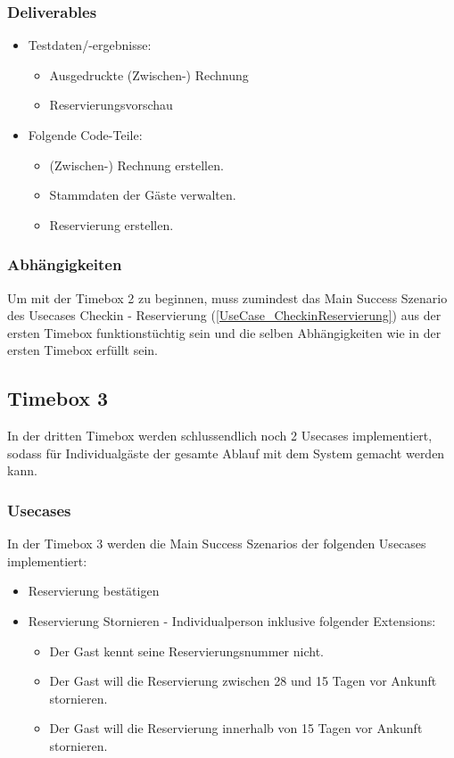 \subsubsection{Deliverables}
\begin{itemize}
	\item Testdaten/-ergebnisse:
	\begin{itemize}
		\item Ausgedruckte (Zwischen-) \Gls{Rechnung}
		\item \Gls{Reservierung}svorschau
	\end{itemize}

	\item Folgende Code-Teile:
	\begin{itemize}
		\item (Zwischen-) \Gls{Rechnung} erstellen.
		\item \Gls{Stammdaten} der Gäste verwalten.
		\item \Gls{Reservierung} erstellen.
	\end{itemize}
\end{itemize}

\subsubsection{Abhängigkeiten}
Um mit der Timebox 2 zu beginnen, muss zumindest das Main Success Szenario des Usecases Checkin - Reservierung (\ref{UseCase_CheckinReservierung}) aus der ersten Timebox funktionstüchtig sein
und die selben Abhängigkeiten wie in der ersten Timebox erfüllt sein.


\subsection{Timebox 3}
In der dritten Timebox werden schlussendlich noch 2 Usecases implementiert, sodass für Individualgäste der gesamte Ablauf mit dem System gemacht werden kann.

\subsubsection{Usecases}
In der Timebox 3 werden die Main Success Szenarios der folgenden Usecases implementiert:

\begin{itemize}
	\item \Gls{Reservierung} bestätigen
	\item \Gls{Reservierung} Stornieren - Individualperson inklusive folgender Extensions:
	\begin{itemize}
		\item Der \Gls{Gast} kennt seine \Gls{Reservierungsnummer} nicht.
		\item Der \Gls{Gast} will die Reservierung zwischen 28 und 15 Tagen vor Ankunft stornieren.
		\item Der \Gls{Gast} will die Reservierung innerhalb von 15 Tagen vor Ankunft stornieren.
	\end{itemize}
\end{itemize}

